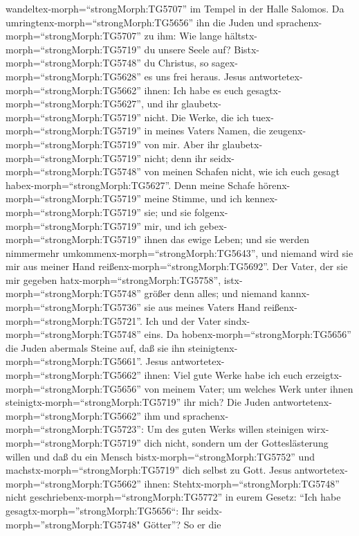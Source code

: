 wandeltex-morph=``strongMorph:TG5707'' im Tempel in der Halle Salomos.
 Da umringtenx-morph=``strongMorph:TG5656'' ihn die Juden
und sprachenx-morph=``strongMorph:TG5707'' zu ihm: Wie lange
hältstx-morph=``strongMorph:TG5719'' du unsere Seele auf?
Bistx-morph=``strongMorph:TG5748'' du Christus, so
sagex-morph=``strongMorph:TG5628'' es uns frei heraus. 
Jesus antwortetex-morph=``strongMorph:TG5662'' ihnen: Ich habe es euch
gesagtx-morph=``strongMorph:TG5627'', und ihr
glaubetx-morph=``strongMorph:TG5719'' nicht. Die Werke, die ich
tuex-morph=``strongMorph:TG5719'' in meines Vaters Namen, die
zeugenx-morph=``strongMorph:TG5719'' von mir.  Aber ihr
glaubetx-morph=``strongMorph:TG5719'' nicht; denn ihr
seidx-morph=``strongMorph:TG5748'' von meinen Schafen nicht, wie ich
euch gesagt habex-morph=``strongMorph:TG5627''.  Denn meine
Schafe hörenx-morph=``strongMorph:TG5719'' meine Stimme, und ich
kennex-morph=``strongMorph:TG5719'' sie; und sie
folgenx-morph=``strongMorph:TG5719'' mir,  und ich
gebex-morph=``strongMorph:TG5719'' ihnen das ewige Leben; und sie werden
nimmermehr umkommenx-morph=``strongMorph:TG5643'', und niemand wird sie
mir aus meiner Hand reißenx-morph=``strongMorph:TG5692''. 
Der Vater, der sie mir gegeben hatx-morph=``strongMorph:TG5758'',
istx-morph=``strongMorph:TG5748'' größer denn alles; und niemand
kannx-morph=``strongMorph:TG5736'' sie aus meines Vaters Hand
reißenx-morph=``strongMorph:TG5721''.  Ich und der Vater
sindx-morph=``strongMorph:TG5748'' eins.  Da
hobenx-morph=``strongMorph:TG5656'' die Juden abermals Steine auf, daß
sie ihn steinigtenx-morph=``strongMorph:TG5661''.  Jesus
antwortetex-morph=``strongMorph:TG5662'' ihnen: Viel gute Werke habe ich
euch erzeigtx-morph=``strongMorph:TG5656'' von meinem Vater; um welches
Werk unter ihnen steinigtx-morph=``strongMorph:TG5719'' ihr mich?
 Die Juden antwortetenx-morph=``strongMorph:TG5662'' ihm
und sprachenx-morph=``strongMorph:TG5723'': Um des guten Werks willen
steinigen wirx-morph=``strongMorph:TG5719'' dich nicht, sondern um der
Gotteslästerung willen und daß du ein Mensch
bistx-morph=``strongMorph:TG5752'' und
machstx-morph=``strongMorph:TG5719'' dich selbst zu Gott. 
Jesus antwortetex-morph=``strongMorph:TG5662'' ihnen:
Stehtx-morph=``strongMorph:TG5748'' nicht
geschriebenx-morph=``strongMorph:TG5772'' in eurem Gesetz: ``Ich habe
gesagtx-morph=''strongMorph:TG5656``: Ihr
seidx-morph=''strongMorph:TG5748" Götter''?  So er die
